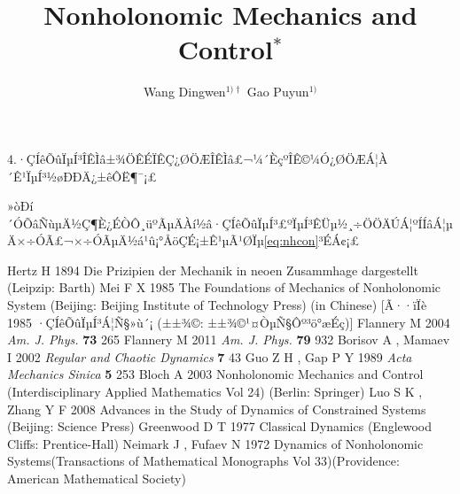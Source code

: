 \documentclass[A4,twoside]{ctexart}
\begin{document}
4.·ÇÍêÕûÏµÍ³ÎÊÌâ±¾ÖÊÉÏÊÇ¿ØÖÆÎÊÌâ£¬¼´ÈçºÎÊ©¼Ó¿ØÖÆÁ¦À´Ê¹ÏµÍ³½øÐÐÄ¿±êÔË¶¯¡£

»òÐí´ÓÕâÑùµÄ½Ç¶È¿ÉÒÔ¸üºÃµÄÀí½â·ÇÍêÕûÏµÍ³£ºÏµÍ³ÊÜµ½¸÷ÖÖÄÚÁ¦ºÍÍâÁ¦µÄ×÷ÓÃ£¬×÷ÓÃµÄ½á¹û¡°ÅöÇÉ¡±Ê¹µÃ¹ØÏµ\eqref{eq:nhcon}³ÉÁ¢¡£


\begin{thebibliography}{999}

 Hertz H 1894 Die Prizipien der Mechanik in neoen Zusammhage dargestellt (Leipzip: Barth)
 Mei F X 1985 The Foundations of Mechanics of Nonholonomic System (Beijing: Beijing Institute of Technology Press) (in Chinese) [Ã··ïÏè 1985 ·ÇÍêÕûÏµÍ³Á¦Ñ§»ù´¡ (±±¾©: ±±¾©¹¤ÒµÑ§Ôº³ö°æÉç)]
 Flannery M 2004 {\it Am. J. Phys.} {\bf 73} 265
 Flannery M 2011 {\it Am. J. Phys.} {\bf 79} 932
 Borisov A , Mamaev I 2002 {\it Regular and Chaotic Dynamics} {\bf 7} 43
 Guo Z H , Gap P Y 1989 {\it Acta Mechanics Sinica} {\bf 5} 253
 Bloch A 2003 Nonholonomic Mechanics and Control (Interdisciplinary Applied Mathematics Vol 24) (Berlin: Springer)
 Luo S K , Zhang Y F 2008 Advances in the Study of Dynamics of Constrained Systems (Beijing: Science Press)
 Greenwood D T 1977 Classical Dynamics (Englewood Cliffs: Prentice-Hall)
 Neimark J , Fufaev N 1972 Dynamics of Nonholonomic Systems(Transactions of Mathematical Monographs Vol 33)(Providence: American Mathematical Society)
\end{thebibliography}

\newpage

\title{{\boldfont}%
Nonholonomic Mechanics and Control$^{\ast}$}

\author{Wang Dingwen$^{1)\dag}$ \quad  Gao Puyun$^{1)}$}



\end{document}
